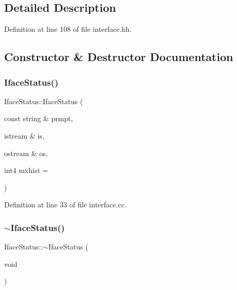 \subsection{Detailed Description}


Definition at line 108 of file interface.\+hh.



\subsection{Constructor \& Destructor Documentation}
\mbox{\label{class_iface_status_ae5606b034f19ee24b4569946817b29c6}} 
\subsubsection{\texorpdfstring{IfaceStatus()}{IfaceStatus()}}
{\footnotesize\ttfamily Iface\+Status\+::\+Iface\+Status (\begin{DoxyParamCaption}\item[{const string \&}]{prmpt,  }\item[{istream \&}]{is,  }\item[{ostream \&}]{os,  }\item[{int4}]{mxhist = {} }\end{DoxyParamCaption})}



Definition at line 33 of file interface.\+cc.

\mbox{\label{class_iface_status_a152d9671686caf590fd91af5eb6e5b9a}} 
\subsubsection{\texorpdfstring{$\sim$IfaceStatus()}{~IfaceStatus()}}
{\footnotesize\ttfamily Iface\+Status\+::$\sim$\+Iface\+Status (\begin{DoxyParamCaption}\item[{void}]{ }\end{DoxyParamCaption})\hspace{0.3cm}{\ttfamily [virtual]}}



